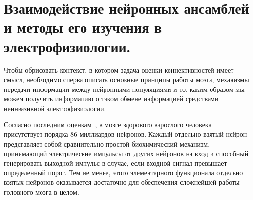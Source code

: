 \chapter{Взаимодействие нейронных ансамблей и методы его изучения в электрофизиологии.} \label{chapt1}




Чтобы обрисовать контекст, в котором задача оценки коннективностей имеет смысл,
необходимо сперва описать основные принципы работы мозга, механизмы передачи
информации между нейронными популяциями и то, каким образом мы можем получить
информацию о таком обмене информацией средствами неинвазивной электрофизиологии.

Согласно последним оценкам~\cite{Azevedo2009}, в мозге здорового взрослого человека присутствует
порядка 86 миллиардов нейронов. Каждый отдельно взятый нейрон представляет собой
сравнительно простой биохимический механизм, принимающий электрические импульсы
от других нейронов на вход и способный генерировать выходной импульс в случае,
если входной сигнал превышает определенный порог. Тем не менее, этого элементарного
функционала отдельно взятых нейронов оказывается достаточно для обеспечения сложнейшей работы
головного мозга в целом.


